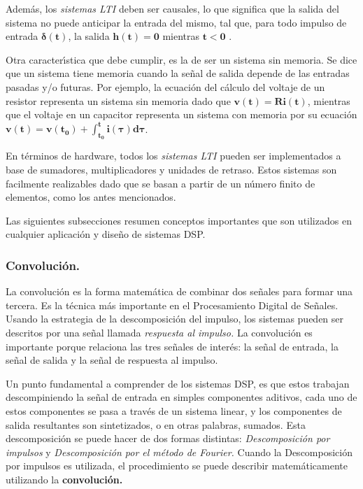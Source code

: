 Adem\'{a}s, los \emph{sistemas LTI}\textbf{\emph{ }}deben ser causales,
lo que significa que la salida del sistema no puede anticipar la entrada
del mismo, tal que, para todo impulso de entrada $\mathbf{\delta(t)}$,
la salida $\mathbf{h(t)=0}$ mientras $\mathbf{t<0}$ .

Otra caracter\'{\i}stica que debe cumplir, es la de ser un sistema
sin memoria. Se dice que un sistema tiene memoria cuando la se\~{n}al
de salida depende de las entradas pasadas y/o futuras. Por ejemplo,
la ecuaci\'{o}n del c\'{a}lculo del voltaje de un resistor representa
un sistema sin memoria dado que $\mathbf{v(t)=Ri(t)}$, mientras que
el voltaje en un capacitor representa un sistema con memoria por su
ecuaci\'{o}n $\mathbf{v(t)=v(t_{0})+\int_{t_{0}}^{t}i(\tau)d\tau}$.

En t\'{e}rminos de hardware, todos los \emph{sistemas LTI} pueden
ser implementados a base de sumadores, multiplicadores y unidades
de retraso. Estos sistemas son facilmente realizables dado que se
basan a partir de un n\'{u}mero finito de elementos, como los antes
mencionados.

Las siguientes subsecciones resumen conceptos importantes que son
utilizados en cualquier aplicaci\'{o}n y dise\~{n}o de sistemas DSP.

\subsubsection{Convoluci\'{o}n.}

La convoluci\'{o}n es la forma matem\'{a}tica de combinar dos se\~{n}ales
para formar una tercera. Es la t\'{e}cnica m\'{a}s importante en el
Procesamiento Digital de Se\~{n}ales. Usando la estrategia de la descomposici\'{o}n
del impulso, los sistemas pueden ser descritos por una se\~{n}al llamada
\emph{respuesta al impulso.} La convoluci\'{o}n es importante porque
relaciona las tres se\~{n}ales de inter\'{e}s: la se\~{n}al de entrada,
la se\~{n}al de salida y la se\~{n}al de respuesta al impulso. 

Un punto fundamental a comprender de los sistemas DSP, es que estos
trabajan descompiniendo la se\~{n}al de entrada en simples componentes
aditivos, cada uno de estos componentes se pasa a trav\'{e}s de un
sistema linear, y los componentes de salida resultantes son sintetizados,
o en otras palabras, sumados. Esta descomposici\'{o}n se puede hacer
de dos formas distintas: \emph{Descomposici\'{o}n por impulsos}\textbf{\emph{
}}y \emph{Descomposici\'{o}n por el m\'{e}todo de Fourier. }Cuando
la Descomposici\'{o}n por impulsos es utilizada, el procedimiento
se puede describir matem\'{a}ticamente utilizando la \textbf{convoluci\'{o}n.}

